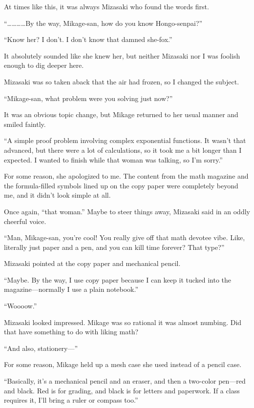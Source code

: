 \documentclass[
    a4paper,
    12pt,
    twoside,
    openany,
    UTF8,
    fontset=windows
]{ctexbook}
\begin{document}
At times like this, it was always Mizasaki who found the words first.

``\dots\dots\dots\dots By the way, Mikage-san, how do you know Hongo-senpai?''

``Know her? I don't. I don't know that damned she-fox.''

It absolutely sounded like she knew her, but neither Mizasaki nor I was foolish enough to dig deeper here.

Mizasaki was so taken aback that the air had frozen, so I changed the subject.

``Mikage-san, what problem were you solving just now?''

It was an obvious topic change, but Mikage returned to her usual manner and smiled faintly.

``A simple proof problem involving complex exponential functions. It wasn't that advanced, but there were a lot of calculations, so it took me a bit longer than I expected. I wanted to finish while that woman was talking, so I'm sorry.''

For some reason, she apologized to me. The content from the math magazine and the formula-filled symbols lined up on the copy paper were completely beyond me, and it didn't look simple at all.

Once again, ``that woman.'' Maybe to steer things away, Mizasaki said in an oddly cheerful voice.

``Man, Mikage-san, you're cool! You really give off that math devotee vibe. Like, literally just paper and a pen, and you can kill time forever? That type?''

Mizasaki pointed at the copy paper and mechanical pencil.

``Maybe. By the way, I use copy paper because I can keep it tucked into the magazine---normally I use a plain notebook.''

``Woooow.''

Mizasaki looked impressed. Mikage was so rational it was almost numbing. Did that have something to do with liking math?

``And also, stationery---''

For some reason, Mikage held up a mesh case she used instead of a pencil case.

``Basically, it's a mechanical pencil and an eraser, and then a two-color pen---red and black. Red is for grading, and black is for letters and paperwork. If a class requires it, I'll bring a ruler or compass too.''
\end{document}
